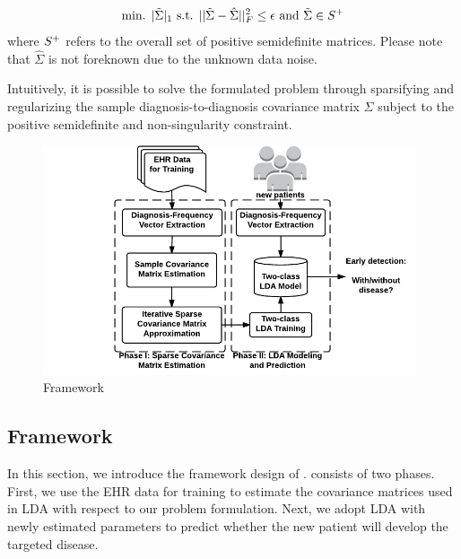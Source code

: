 \begin{equation}
\begin{aligned}
\text{min. }|\tilde{\Sigma}|_1 \text{ s.t. }||\tilde{\Sigma}-\hat{\Sigma}||_F^2\leq \epsilon\text{ and }\tilde{\Sigma}\in {\bf }S^+
\end{aligned}
\label{eq:problem}
\end{equation}
where ${\bf }S^+$ refers to the overall set of positive semidefinite matrices. 
Please note that $\hat{\Sigma}$ is not foreknown due to the unknown data noise. 

Intuitively, it is possible to solve the formulated problem through sparsifying and regularizing the sample diagnosis-to-diagnosis covariance matrix $\Sigma$ subject to the positive semidefinite and non-singularity constraint. 


\begin{figure}
\begin{center}
\includegraphics[width=0.98\textwidth]{./img/daehr.pdf}
\end{center}
\caption{\TheName{} Framework}
\end{figure}


\subsection{\TheName{} Framework}
In this section, we introduce the framework design of \TheName{}. 
\TheName{} consists of two phases.  
First, we use the EHR data for training to estimate the covariance matrices used in LDA with respect to our problem formulation. 
Next, we adopt LDA with newly estimated parameters to predict whether the new patient will develop the targeted disease.

